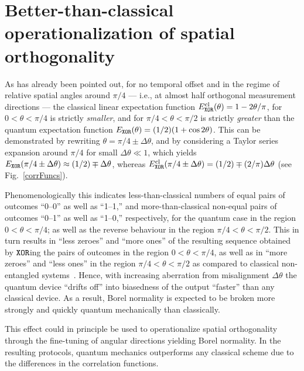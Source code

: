 \documentclass{mscs}
\begin{document}
\section{Better-than-classical operationalization of spatial orthogonality}
\label{ss-orthogonality}



As has already been pointed out, for no temporal offset and
in the regime of relative spatial angles around $\pi/4$ --- i.e., at almost half orthogonal measurement directions ---
the classical linear expectation function
$E^{\text{cl}} _{\tt XOR}(\theta ) = {1-2 \theta / \pi}$,
for $0 < \theta < \pi /4$
is strictly {\em smaller},
and for $\pi /4 < \theta < \pi /2$ is strictly {\em greater}
than the quantum expectation function
$E_{\tt XOR}(\theta ) = (1/2)(1+\cos 2\theta )$.
This can be demonstrated by rewriting
$\theta =\pi /4 \pm \Delta \theta$,
and by considering  a Taylor series expansion around $\pi /4$
for small $\Delta \theta  \ll 1$, which yields
$E_{\tt XOR}(\pi/4\pm \Delta \theta  ) \approx (1/2) \mp  \Delta \theta $,
whereas
$E^{\text{cl}} _{\tt XOR}(\pi/4\pm \Delta \theta ) = (1/2) \mp (2 / \pi )\Delta \theta $ (see Fig.~\ref{corrFuncs}).



Phenomenologically this indicates
less-than-classical numbers of equal pairs of outcomes ``0--0'' as well as   ``1--1,''
and
more-than-classical non-equal pairs of outcomes ``0--1'' as well as   ``1--0,'' respectively,
for the quantum case in the region $0 < \theta < \pi /4$; as well as the reverse behaviour in the region $\pi /4 < \theta < \pi /2$.
This  in turn results in ``less zeroes'' and ``more ones'' of the resulting sequence obtained by ${\tt XOR}$ing the pairs of outcomes in the region $0 < \theta < \pi /4$,
as well as in ``more zeroes'' and ``less ones'' in the region $\pi /4 < \theta < \pi /2$ as compared to classical non-entangled systems~\citep{peres222}.
Hence, with increasing aberration from misalignment  $\Delta \theta$ the quantum device ``drifts off'' into biasedness of the output  ``faster'' than any classical device.
As a result, Borel normality is expected to be broken more strongly and quickly quantum mechanically than classically.

This effect could in principle be used to operationalize spatial orthogonality through the fine-tuning of angular directions yielding Borel normality.
In the resulting protocols, quantum mechanics outperforms any classical scheme due to the differences in the correlation functions.
\end{document}

